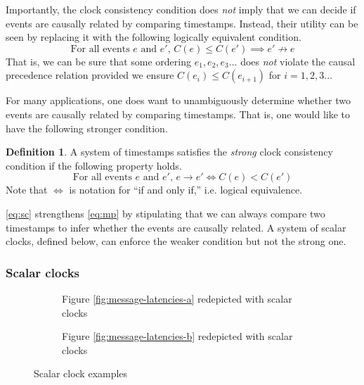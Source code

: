 \documentclass[]             %
{NASA}                       %
\theoremstyle{definition}
\newtheorem{definition}{Definition}[section]
\begin{document}
Importantly, the clock consistency condition does \emph{not} imply
that we can decide if events are causally related by comparing
timestamps. Instead, their utility can be seen by replacing it
with the following logically equivalent condition.
\[ \textrm{For all events $e$ and $e'$, }C(e) \leq C(e') \implies e'
  \not\to e \label{eq:mp-conv} \] That is, we can be sure that some
ordering $e_1, e_2, e_3\ldots$ does \emph{not} violate the causal
precedence relation provided we ensure $C(e_{i}) \leq C(e_{i+1})$ for $i = 1, 2, 3\ldots$

For many applications, one does want to unambiguously determine
whether two events are causally related by comparing timestamps. That
is, one would like to have the following stronger condition.
\begin{definition}
  A system of timestamps satisfies the \emph{strong} clock consistency
  condition if the following property holds.
  \[ \textrm{For all events $e$ and $e'$, } e \to e' \iff C(e) < C(e') \label{eq:sc}\tag{SC} \]
  Note that $\iff$ is notation for ``if and only if,'' i.e. logical equivalence.
\end{definition}
\ref{eq:sc} strengthens \ref{eq:mp} by stipulating that we can always
compare two timestamps to infer whether the events are causally
related. A system of scalar clocks, defined below, can enforce the
weaker condition but not the strong one.

\subsubsection{Scalar clocks}
\begin{figure}
  \setlength\belowcaptionskip{5ex}

  \begin{subfigure}{1\textwidth}
    \centering 
    \caption{Figure \ref{fig:message-latencies-a} redepicted with scalar clocks}
    \label{fig:message-latencies-scalar-a}
  \end{subfigure}

  \begin{subfigure}{1\textwidth}
    \centering 
    \caption{Figure \ref{fig:message-latencies-b} redepicted with scalar clocks}
    \label{fig:message-latencies-scalar-b}
  \end{subfigure}

  \caption{Scalar clock examples}
  \label{fig:message-latencies-scalar}
\end{figure}
\end{document}
